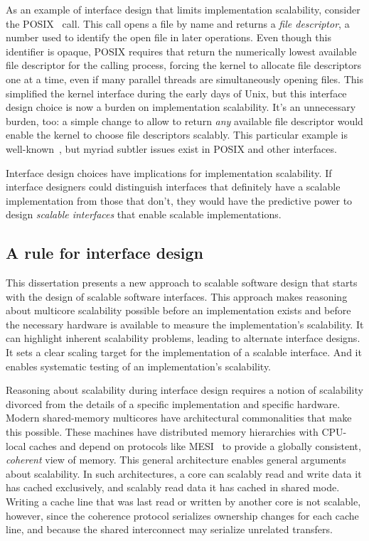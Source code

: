As an example of interface design that limits implementation
scalability, consider the POSIX~\cite{posix2013}  call.
%
This call opens a
file by name and returns a \emph{file descriptor}, a number used to
identify the open file in later operations.
%
Even though this identifier is opaque, POSIX requires that 
return the numerically lowest available file descriptor for the
calling process, forcing the kernel to allocate file descriptors one
at a time, even if many parallel threads are simultaneously opening
files.
%
This simplified the kernel interface during the early days of Unix,
but this interface design choice is now a burden on implementation
scalability.
%
It's an unnecessary burden, too: a simple change to allow 
to return \emph{any} available file descriptor would enable the kernel
to choose file descriptors scalably.
%
This particular example is well-known~\cite{boyd-wickizer:corey}, but
myriad subtler issues exist in POSIX and other interfaces.

Interface design choices have implications for implementation
scalability.
%
If interface designers could distinguish interfaces that definitely
have a scalable implementation from those that don't, they would have
the predictive power to design \emph{scalable interfaces} that enable
scalable implementations.


\subsection{A rule for interface design}

This dissertation presents a new approach to scalable software design
that starts with the design of scalable software interfaces.
%
This approach makes reasoning about multicore scalability possible
before an implementation exists and before the necessary hardware is
available to measure the implementation's scalability.
%
It can highlight inherent scalability problems, leading to alternate
interface designs.
%
It sets a clear scaling target for the implementation of a
scalable interface.  And it enables systematic testing of an
implementation's scalability.

Reasoning about scalability during interface design requires a notion
of scalability divorced from the details of a specific
implementation and specific hardware.
%
Modern shared-memory multicores have architectural commonalities that
make this possible.  These machines have distributed memory
hierarchies with CPU-local caches and depend on protocols like
MESI~\cite{papamarcos:mesi} to provide a globally consistent,
\emph{coherent} view of memory.  This general architecture enables
general arguments about scalability.
%
In such architectures, a core can scalably read and write data it has
cached exclusively, and scalably read data it has cached in shared
mode. Writing a cache line that was last read or written by another
core is not scalable, however, since the coherence protocol serializes
ownership changes for each cache line, and because the shared
interconnect may serialize unrelated transfers.

